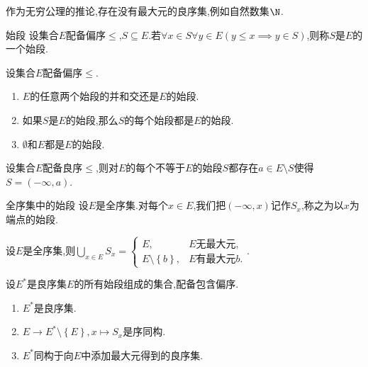 \begin{remark}{}{}
	作为无穷公理的推论,存在没有最大元的良序集,例如自然数集$\N$.
\end{remark}

\begin{definition}{始段}{}
	设集合$E$配备偏序$\leq$,$S\subseteq E$.若$\forall x\in S\forall y\in E\left(y\leq x\implies y\in S\right)$,则称$S$是$E$的一个始段.
\end{definition}

\begin{proposition}{}{}
	设集合$E$配备偏序$\leq$.
	\begin{enumerate}
		\item $E$的任意两个始段的并和交还是$E$的始段.
		\item 如果$S$是$E$的始段,那么$S$的每个始段都是$E$的始段.
		\item $\emptyset$和$E$都是$E$的始段.
	\end{enumerate}
\end{proposition}

\begin{proposition}{}{}
	设集合$E$配备良序$\leq$,则对$E$的每个不等于$E$的始段$S$都存在$a\in E\setminus S$使得$S=\left(-\infty,a\right)$.
\end{proposition}

\begin{definition}{全序集中的始段}{}
	设$E$是全序集.对每个$x\in E$,我们把$\left(-\infty,x\right)$记作$S_{x}$,称之为以$x$为端点的始段.
\end{definition}

\begin{proposition}{}{}
	设$E$是全序集,则$\bigcup\limits_{x\in E}S_{x}=
	\begin{cases}
		E,&E\text{无最大元},\\
		E\setminus\left\{b\right\},&E\text{有最大元}b.
	\end{cases}$.
\end{proposition}

\begin{proposition}{}{}
	设$E^{\ast}$是良序集$E$的所有始段组成的集合,配备包含偏序.
	\begin{enumerate}
		\item $E^{\ast}$是良序集.
		\item $E\to E^{\ast}\setminus\left\{E\right\},x\mapsto S_{x}$是序同构.
		\item $E^{\ast}$同构于向$E$中添加最大元得到的良序集.
	\end{enumerate}
\end{proposition}

